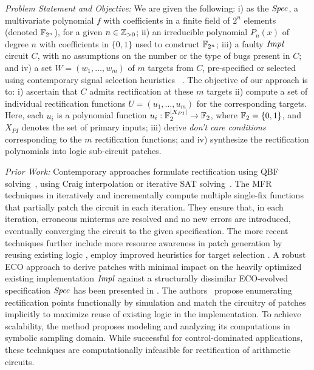 
{\it Problem Statement and Objective:}
We are given the following: i) as the ${\it Spec}$, a multivariate
polynomial $f$ with coefficients in a finite field of $2^n$ elements
(denoted ${\mathbb{F}}_{2^n}$), for a given  $n\in {\mathbb{Z}}_{> 0}$; ii) an irreducible
polynomial $P_n(x)$ of degree $n$ with coefficients in $\{0,1\}$ used 
to construct ${\mathbb{F}}_{2^n}$; iii) a faulty ${\it Impl}$ circuit $C$,
with no assumptions on the number or the type of bugs present in
$C$; and iv) a set $W = (w_1,\dots,w_m)$ of $m$ targets from $C$,
pre-specified or selected using contemporary signal selection heuristics 
~\cite{SS_Alan:DAC18,SS_Fujita:ISCAS19,SS_Roland:DAC19}.
The objective of our approach is to: 
{\red i) ascertain that $C$ 
admits rectification at these $m$ targets}
ii) compute a set
of individual rectification functions $U =
(u_1,\dots,u_m)$ for the corresponding targets. Here, each $u_i$ is a 
polynomial function $u_i:{\mathbb{F}}_2^{|X_{PI}|}\rightarrow{\mathbb{F}}_2$, where ${\mathbb{F}}_2=\{0,1\}$, 
and $X_{PI}$ denotes the
set of primary inputs; iii) derive {\it don't care conditions}
corresponding to the $m$ rectification functions; and iv) synthesize
the rectification polynomials into logic sub-circuit patches.


{\it Prior Work:} Contemporary approaches formulate rectification
using QBF solving~\cite{scholl:2}, using Craig interpolation or iterative SAT
solving~\cite{MF_Huang:DATE12}.  
The MFR techniques in 
\cite{SS_Fujita:ISCAS19,MF_Huang:DATE12,SS_Roland:DAC18} 
iteratively and incrementally compute multiple single-fix functions
that partially patch the circuit in each iteration.
{\red They ensure that, in each iteration, erroneous minterms are resolved
and no new errors are introduced, eventually converging the circuit
to the given specification.}
The more recent techniques further
include more resource awareness in patch generation by reusing
existing logic \cite{SS_Alan:DAC18}, employ improved heuristics for
target selection \cite{SS_Fujita:ISCAS19}.
{\red A robust ECO approach to derive patches with minimal 
impact on the heavily optimized existing implementation ${\it Impl}$ against 
a structurally dissimilar ECO-evolved specification ${\it Spec}$ has been presented in
\cite{SS_Roland:DAC19}. 
The authors~\cite{SS_Roland:DAC19} propose enumerating rectification points 
functionally by simulation and match the circuitry of patches implicitly to maximize reuse of 
existing logic in the implementation. To achieve scalability, the method proposes 
modeling and analyzing its computations in symbolic sampling domain. }
While successful for control-dominated applications, these techniques are
computationally infeasible for rectification of arithmetic circuits.

